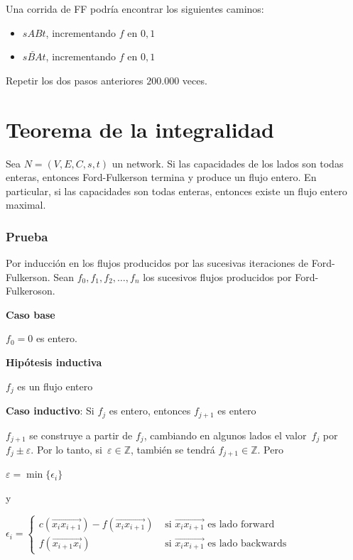 \documentclass[10pt,a4paper]{article}
\begin{document}
Una corrida de FF podría encontrar los siguientes caminos:

\begin{itemize}

	\item $sABt$, incrementando $f$ en $0,1$
	\item $s\overleftarrow{BA}t$, incrementando $f$ en $0,1$
\end{itemize}

Repetir los dos pasos anteriores $200.000$ veces.

\section*{Teorema de la integralidad}

Sea $N = (V, E, C, s, t)$ un network. Si las capacidades de los lados son todas enteras, entonces Ford-Fulkerson termina y produce un flujo entero. En particular, si las capacidades son todas enteras, entonces existe un flujo entero maximal.

\subsubsection*{\textbf{Prueba}}

Por inducción en los flujos producidos por las sucesivas iteraciones de Ford-Fulkerson. Sean $f_0, f_1, f_2, \dots, f_n$ los sucesivos flujos producidos por Ford-Fulkeroson.

\textbf{Caso base}

$f_0 = 0$ es entero.

\textbf{Hipótesis inductiva}

$f_j$ es un flujo entero

\textbf{Caso inductivo}: Si $f_j$ es entero, entonces $f_{j+1}$ es entero

$f_{j+1}$ se construye a partir de $f_j$, cambiando en algunos lados el valor $f_j$ por $f_j \pm \varepsilon$. Por lo tanto, si $\varepsilon \in \mathbb{Z}$, también se tendrá $f_{j+1} \in \mathbb{Z}$. Pero

\begin{center}
$\varepsilon = \min\{\epsilon_i\}$
\end{center}

y

\begin{center}
$\epsilon_i = \begin{cases} c(\overrightarrow{x_ix_{i+1}}) - f(\overrightarrow{x_ix_{i+1}}) & \text{ si } \overrightarrow{x_ix_{i+1}} \text{ es lado forward}\\ f(\overrightarrow{x_{i+1}x_i}) &\text{ si } \overrightarrow{x_ix_{i+1}} \text{ es lado backwards} \end{cases}$
\end{center}
\end{document}

